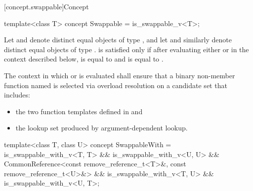 [concept.swappable]{Concept }

%
\begin{itemdecl}
template<class T>
  concept Swappable = is_swappable_v<T>;
\end{itemdecl}

\begin{itemdescr}
\pnum
Let  and  denote distinct equal objects of type ,
and let  and  similarly denote distinct equal objects of
type .  is satisfied only if after
evaluating either  or  in the context
described below,  is equal to  and  is equal to
.

\pnum
The context in which  or  is evaluated
shall ensure that a binary non-member function named  is selected via
overload resolution on a candidate set that includes:
\begin{itemize}
\item the two  function templates defined in
   and
\item the lookup set produced by argument-dependent
  lookup.
\end{itemize}
\end{itemdescr}

%
\begin{itemdecl}
template<class T, class U>
  concept SwappableWith =
    is_swappable_with_v<T, T> && is_swappable_with_v<U, U> &&
    CommonReference<const remove_reference_t<T>&, const remove_reference_t<U>&> &&
    is_swappable_with_v<T, U> && is_swappable_with_v<U, T>;
\end{itemdecl}

